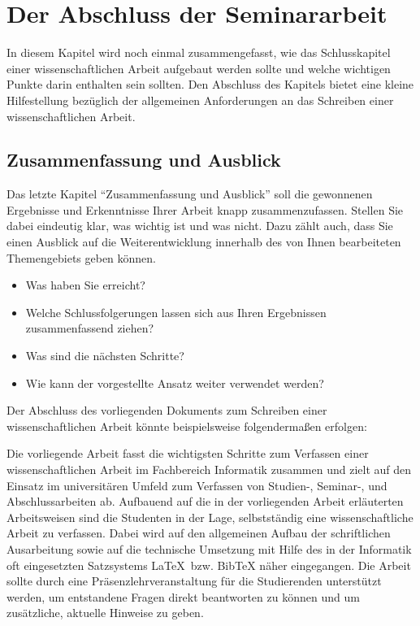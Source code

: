 %
\section{Der Abschluss der Seminararbeit}
\label{sec_conclusion}
In diesem Kapitel wird noch einmal zusammengefasst, wie das Schlusskapitel einer wissenschaftlichen Arbeit aufgebaut werden sollte und welche wichtigen Punkte darin enthalten sein sollten.
Den Abschluss des Kapitels bietet eine kleine Hilfestellung bezüglich der allgemeinen Anforderungen an das Schreiben einer wissenschaftlichen Arbeit.

\subsection{Zusammenfassung und Ausblick}
Das letzte Kapitel "`Zusammenfassung und Ausblick"' soll die gewonnenen Ergebnisse und Erkenntnisse Ihrer Arbeit knapp zusammenzufassen.
Stellen Sie dabei eindeutig klar, was wichtig ist und was nicht.
Dazu zählt auch, dass Sie einen Ausblick auf die Weiterentwicklung innerhalb des von Ihnen bearbeiteten Themengebiets geben können.
\begin{itemize}
\item Was haben Sie erreicht?
\item Welche Schlussfolgerungen lassen sich aus Ihren Ergebnissen zusammenfassend ziehen?
\item Was sind die nächsten Schritte?
\item Wie kann der vorgestellte Ansatz weiter verwendet werden?
\end{itemize}

Der Abschluss des vorliegenden Dokuments zum Schreiben einer wissenschaftlichen Arbeit könnte beispielsweise folgendermaßen erfolgen:

\smallskip

Die vorliegende Arbeit fasst die wichtigsten Schritte zum Verfassen einer wissenschaftlichen Arbeit im Fachbereich Informatik zusammen und zielt auf den Einsatz im universitären Umfeld zum Verfassen von Studien-, Seminar-, und Abschlussarbeiten ab. 
Aufbauend auf die in der vorliegenden Arbeit erläuterten Arbeitsweisen sind die Studenten in der Lage, selbstständig eine wissenschaftliche Arbeit zu verfassen.
Dabei wird auf den allgemeinen Aufbau der schriftlichen Ausarbeitung sowie auf die technische Umsetzung mit Hilfe des in der Informatik oft eingesetzten Satzsystems \LaTeX \ bzw. BibTeX näher eingegangen.  
Die Arbeit sollte durch eine Präsenzlehrveranstaltung für die Studierenden unterstützt werden, um entstandene Fragen direkt beantworten zu können und um zusätzliche, aktuelle Hinweise zu geben.


